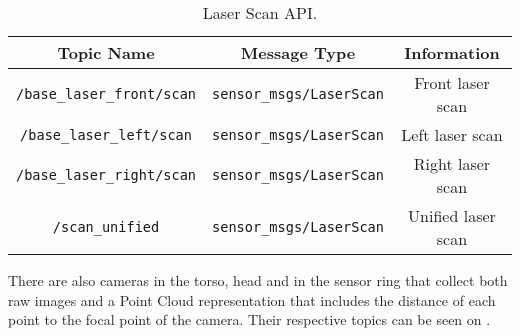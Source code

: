 \begin{table}[!ht]
\caption{Laser Scan API.} \label{tab:laserapi}
\centering
\renewcommand*{\arraystretch}{1.1}
\begin{tabular}{c|c|c}
Topic Name & Message Type & Information \\
\hline
\texttt{/base\_laser\_front/scan} & \texttt{sensor\_msgs/LaserScan} & Front laser scan \\ \hline
\texttt{/base\_laser\_left/scan} & \texttt{sensor\_msgs/LaserScan} & Left laser scan \\ \hline
\texttt{/base\_laser\_right/scan} & \texttt{sensor\_msgs/LaserScan} & Right laser scan \\ \hline
\texttt{/scan\_unified} & \texttt{sensor\_msgs/LaserScan} & Unified laser scan \\ \hline
\end{tabular}
\end{table}

There are also cameras in the torso, head and in the sensor ring that collect both raw images and a Point Cloud representation that includes the distance of each point to the focal point of the camera. Their respective topics can be seen on .

